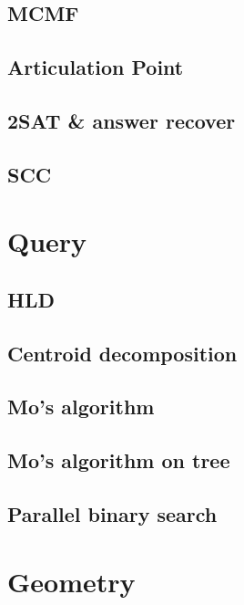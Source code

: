 \documentclass[10pt,landscape,a4paper,twocolumn]{article}
\begin{document}
\subsection{MCMF}
%

\subsection{Articulation Point}


\subsection{2SAT \& answer recover}


\subsection{SCC}
%

\section{Query}
\subsection{HLD}


\subsection{Centroid decomposition}


\subsection{Mo's algorithm}


\subsection{Mo's algorithm on tree}


\subsection{Parallel binary search}



\section{Geometry}
\end{document}
